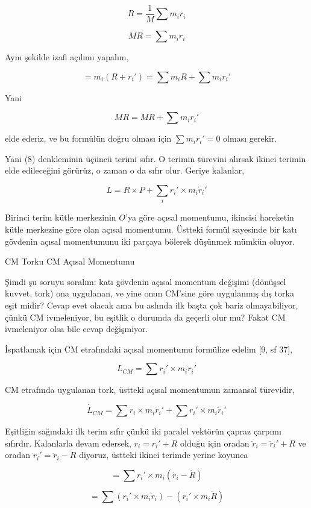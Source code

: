 \documentclass[12pt,fleqn]{article}\usepackage{../../common}
\begin{document}
$$
R = \frac{1}{M} \sum m_i r_i
$$

$$
MR = \sum m_i r_i
$$

Aynı şekilde izafi açılımı yapalım,

$$
= m_i (R + r_i') = \sum m_i R + \sum m_i r_i'
$$

Yani

$$
MR = MR + \sum m_i r_i'
$$

elde ederiz, ve bu formülün doğru olması için $\sum m_i r_i' = 0$ olması gerekir.

Yani (8) denkleminin üçüncü terimi sıfır. O terimin türevini alırsak
ikinci terimin elde edileceğini görürüz, o zaman o da sıfır olur. Geriye
kalanlar,

$$
L = R \times P + \sum_i r_i' \times m_i \dot{r}_i' 
$$

Birinci terim kütle merkezinin $O$'ya göre açısal momentumu, ikincisi hareketin
kütle merkezine göre olan açısal momentumu. Üstteki formül sayesinde bir
katı gövdenin açısal momentumunu iki parçaya bölerek düşünmek mümkün oluyor.


CM Torku CM Açısal Momentumu

Şimdi şu soruyu soralım: katı gövdenin açısal momentum değişimi (dönüşsel
kuvvet, tork) ona uygulanan, ve yine onun CM'sine göre uygulanmış dış torka eşit
midir? Cevap evet olacak ama bu aslında ilk başta çok bariz olmayabiliyor, çünkü
CM ivmeleniyor, bu eşitlik o durumda da geçerli olur mu? Fakat CM ivmeleniyor
olsa bile cevap değişmiyor.

İspatlamak için CM etrafındaki açısal momentumu formülize edelim [9, sf 37],

$$
L_{CM} = \sum r_i' \times m_i \dot{r}_i' 
$$

CM etrafında uygulanan tork, üstteki açısal momentumun zamansal türevidir, 

$$
\dot{L}_{CM} = \sum \dot{r}_i \times m_i \dot{r}_i' + \sum r_i' \times m_i\ddot{r}_i'
$$

Eşitliğin sağındaki ilk terim sıfır çünkü iki paralel vektörün çapraz çarpımı
sıfırdır. Kalanlarla devam edersek, $r_i = r_i' + R$ olduğu için oradan
$\ddot{r}_i = \ddot{r}_i' + \ddot{R}$ ve oradan $\ddot{r}_i' = \ddot{r}_i -
\ddot{R}$ diyoruz, üstteki ikinci terimde yerine koyunca

$$
= \sum r_i' \times m_i (\ddot{r}_i - \ddot{R})
$$

$$
= \sum (r_i' \times m_i \ddot{r}_i) - (r_i' \times m_i \ddot{R})
$$
\end{document}
